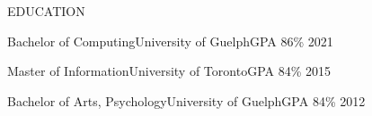 \documentclass[]{mcdowellcv}
\begin{document}
  \begin{cvsection}{EDUCATION}
		\begin{cveducation}{Bachelor of Computing}{University of Guelph}{GPA 86\% 2021}
		\end{cveducation}

		\begin{cveducation}{Master of Information}{University of Toronto}{GPA 84\% 2015}
		\end{cveducation}

		\begin{cveducation}{Bachelor of Arts, Psychology}{University of Guelph}{GPA 84\% 2012}
		\end{cveducation}
	\end{cvsection}
\end{document}
